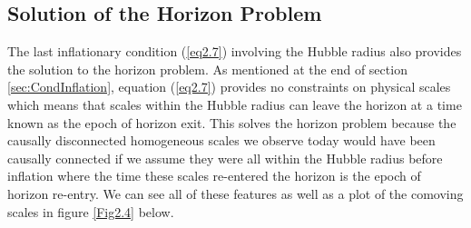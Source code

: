 \documentclass[a4paper,12pt,twoside]{report}
\begin{document}
\noindent%
\begin{minipage}{\linewidth}%
\label{Fig2.3}
\end{minipage}

\subsection{Solution of the Horizon Problem} \label{subsec:HorSol}

The last inflationary condition (\ref{eq2.7}) involving the Hubble radius also provides the solution to the horizon problem. As mentioned at the end of section \ref{sec:CondInflation}, equation (\ref{eq2.7}) provides no constraints on physical scales which means that scales within the Hubble radius can leave the horizon at a time known as the epoch of horizon exit. This solves the horizon problem because the causally disconnected homogeneous scales we observe today would have been causally connected if we assume they were all within the Hubble radius before inflation where the time these scales re-entered the horizon is the epoch of horizon re-entry. We can see all of these features as well as a plot of the comoving scales in figure \ref{Fig2.4} below.
\end{document}
